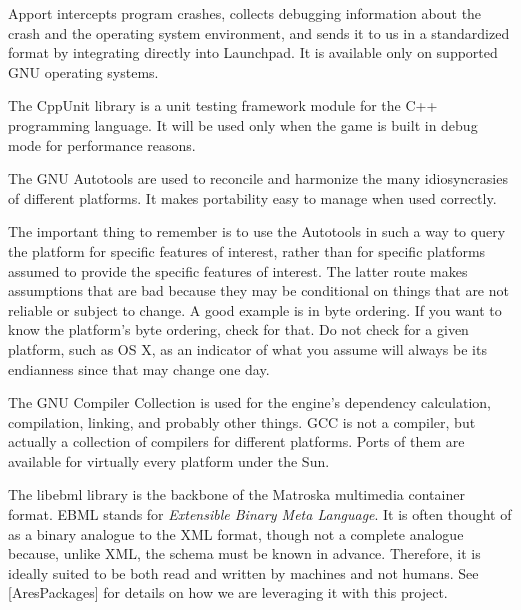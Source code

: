

\startitemize[4]

Apport intercepts program crashes, collects debugging information about the crash and the operating system environment, and sends it to us in a standardized format by integrating directly into Launchpad. It is available only on supported GNU operating systems.


The CppUnit library is a unit testing framework module for the C++ programming language. It will be used only when the game is built in debug mode for performance reasons.


The GNU Autotools are used to reconcile and harmonize the many idiosyncrasies of different platforms. It makes portability easy to manage when used correctly. 

The important thing to remember is to use the Autotools in such a way to query the platform for specific features of interest, rather than for specific platforms assumed to provide the specific features of interest. The latter route makes assumptions that are bad because they may be conditional on things that are not reliable or subject to change. A good example is in byte ordering. If you want to know the platform's byte ordering, check for that. Do not check for a given platform, such as OS X, as an indicator of what you assume will always be its endianness since that may change one day.


The GNU Compiler Collection is used for the engine's dependency calculation, compilation, linking, and probably other things. GCC is not a compiler, but actually a collection of compilers for different platforms. Ports of them are available for virtually every platform under the Sun.


The libebml library is the backbone of the Matroska multimedia container format. EBML stands for {\it Extensible Binary Meta Language}. It is often thought of as a binary analogue to the XML format, though not a complete analogue because, unlike XML, the schema must be known in advance. Therefore, it is ideally suited to be both read and written by machines and not humans. See [AresPackages] for details on how we are leveraging it with this project.

